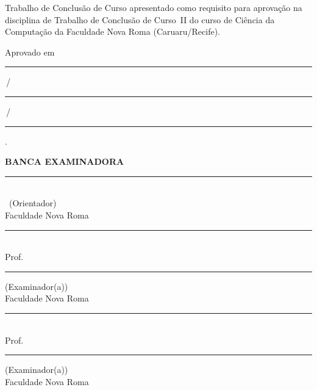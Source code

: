 \begingroup
\singlespacing
\begin{center}
\vspace*{1.2cm}

{\bfseries \tccautor}

\vfill

{\large\bfseries \tcctitulo}
\end{center}

\vspace{1.0cm}

\noindent\hspace*{7cm}\begin{minipage}{7.5cm}
\singlespacing\small
Trabalho de Conclusão de Curso apresentado como requisito para aprovação na
disciplina de Trabalho de Conclusão de Curso~II do curso de Ciência da
Computação da Faculdade Nova Roma (Caruaru/Recife).
\end{minipage}

\vspace{1.4cm}
\noindent Aprovado em \rule{1.2cm}{0.4pt}\,/\,\rule{1.2cm}{0.4pt}\,/\,\rule{1.8cm}{0.4pt}.

\vspace{1.6cm}
\begin{center}
{\bfseries BANCA EXAMINADORA}
\end{center}

\vspace{1.4cm}
\begin{center}
\rule{10cm}{0.4pt}\\
\tccorientador\ (Orientador)\\
Faculdade Nova Roma

\vspace{1.4cm}
\rule{10cm}{0.4pt}\\
Prof.\ \rule{5cm}{0.4pt} (Examinador(a))\\
Faculdade Nova Roma

\vspace{1.4cm}
\rule{10cm}{0.4pt}\\
Prof.\ \rule{5cm}{0.4pt} (Examinador(a))\\
Faculdade Nova Roma
\end{center}

\vfill
\endgroup
\newpage
